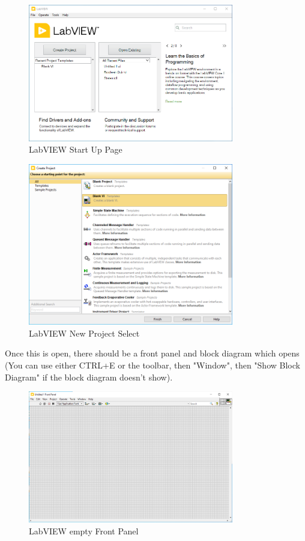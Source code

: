 \documentclass[a4paper,11pt]{report}
\begin{document}
\begin{figure}[H]
\centering
\includegraphics[width=0.8\textwidth]{screenshots/labview1}
\caption{LabVIEW Start Up Page}
\end{figure}

\begin{figure}[H]
\centering
\includegraphics[width=0.8\textwidth]{screenshots/labview2}
\caption{LabVIEW New Project Select}
\end{figure}

Once this is open, there should be a front panel and block diagram which opens (You can use either CTRL+E or the toolbar, then "Window", then "Show Block Diagram" if the block diagram doesn't show).

\begin{figure}[H]
\centering
\includegraphics[width=0.8\textwidth]{screenshots/labview3}
\caption{LabVIEW empty Front Panel}
\end{figure}
\end{document}
